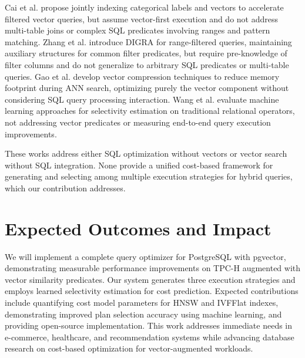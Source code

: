\documentclass[conference]{IEEEtran}
\begin{document}
Cai et al. \cite{nav-labels} propose jointly indexing categorical labels and vectors to accelerate filtered vector queries, but assume vector-first execution and do not address multi-table joins or complex SQL predicates involving ranges and pattern matching. Zhang et al. \cite{digra} introduce DIGRA for range-filtered queries, maintaining auxiliary structures for common filter predicates, but require pre-knowledge of filter columns and do not generalize to arbitrary SQL predicates or multi-table queries. Gao et al. \cite{quantization} develop vector compression techniques to reduce memory footprint during ANN search, optimizing purely the vector component without considering SQL query processing interaction. Wang et al. \cite{learned-card} evaluate machine learning approaches for selectivity estimation on traditional relational operators, not addressing vector predicates or measuring end-to-end query execution improvements.

These works address either SQL optimization without vectors or vector search without SQL integration. None provide a unified cost-based framework for generating and selecting among multiple execution strategies for hybrid queries, which our contribution addresses.

\section{Expected Outcomes and Impact}

We will implement a complete query optimizer for PostgreSQL with pgvector, demonstrating measurable performance improvements on TPC-H augmented with vector similarity predicates. Our system generates three execution strategies and employs learned selectivity estimation for cost prediction. Expected contributions include quantifying cost model parameters for HNSW and IVFFlat indexes, demonstrating improved plan selection accuracy using machine learning, and providing open-source implementation. This work addresses immediate needs in e-commerce, healthcare, and recommendation systems while advancing database research on cost-based optimization for vector-augmented workloads.
\end{document}
